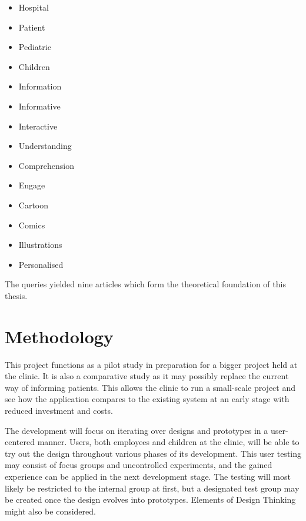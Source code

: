 \begin{multicols}{3}
    \raggedcolumns
    \begin{itemize}
        \item Hospital
        \item Patient
        \item Pediatric
        \item Children
        \item Information
        \item Informative
        \item Interactive
        \item Understanding
        \item Comprehension
        \item Engage
        \item Cartoon
        \item Comics
        \item Illustrations
        \item Personalised
    \end{itemize}
\end{multicols}

The queries yielded nine articles which form the theoretical foundation of this thesis.


\section{Methodology}

This project functions as a pilot study in preparation for a bigger project held at the clinic. It is also a comparative study as it may possibly replace the current way of informing patients. This allows the clinic to run a small-scale project and see how the application compares to the existing system at an early stage with reduced investment and costs.

The development will focus on iterating over designs and prototypes in a user-centered manner. Users, both employees and children at the clinic, will be able to try out the design throughout various phases of its development. This user testing may consist of focus groups and uncontrolled experiments, and the gained experience can be applied in the next development stage. The testing will most likely be restricted to the internal group at first, but a designated test group may be created once the design evolves into prototypes. Elements of Design Thinking might also be considered.


